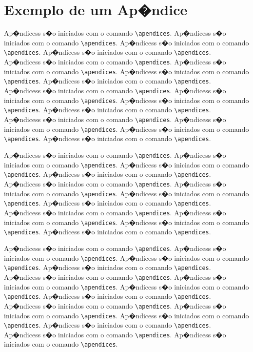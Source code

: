 \chapter{Exemplo de um Ap�ndice}
\label{apend:1}
Ap�ndicess s�o iniciados com o comando \verb|\apendices|.
Ap�ndicess s�o iniciados com o comando \verb|\apendices|.
Ap�ndicess s�o iniciados com o comando \verb|\apendices|.
Ap�ndicess s�o iniciados com o comando \verb|\apendices|.
Ap�ndicess s�o iniciados com o comando \verb|\apendices|.
Ap�ndicess s�o iniciados com o comando \verb|\apendices|.
Ap�ndicess s�o iniciados com o comando \verb|\apendices|.
Ap�ndicess s�o iniciados com o comando \verb|\apendices|.
Ap�ndicess s�o iniciados com o comando \verb|\apendices|.
Ap�ndicess s�o iniciados com o comando \verb|\apendices|.
Ap�ndicess s�o iniciados com o comando \verb|\apendices|.
Ap�ndicess s�o iniciados com o comando \verb|\apendices|.
Ap�ndicess s�o iniciados com o comando \verb|\apendices|.
Ap�ndicess s�o iniciados com o comando \verb|\apendices|.
Ap�ndicess s�o iniciados com o comando \verb|\apendices|.
Ap�ndicess s�o iniciados com o comando \verb|\apendices|.

Ap�ndicess s�o iniciados com o comando \verb|\apendices|.
Ap�ndicess s�o iniciados com o comando \verb|\apendices|.
Ap�ndicess s�o iniciados com o comando \verb|\apendices|.
Ap�ndicess s�o iniciados com o comando \verb|\apendices|.
Ap�ndicess s�o iniciados com o comando \verb|\apendices|.
Ap�ndicess s�o iniciados com o comando \verb|\apendices|.
Ap�ndicess s�o iniciados com o comando \verb|\apendices|.
Ap�ndicess s�o iniciados com o comando \verb|\apendices|.
Ap�ndicess s�o iniciados com o comando \verb|\apendices|.
Ap�ndicess s�o iniciados com o comando \verb|\apendices|.
Ap�ndicess s�o iniciados com o comando \verb|\apendices|.
Ap�ndicess s�o iniciados com o comando \verb|\apendices|.

Ap�ndicess s�o iniciados com o comando \verb|\apendices|.
Ap�ndicess s�o iniciados com o comando \verb|\apendices|.
Ap�ndicess s�o iniciados com o comando \verb|\apendices|.
Ap�ndicess s�o iniciados com o comando \verb|\apendices|.
Ap�ndicess s�o iniciados com o comando \verb|\apendices|.
Ap�ndicess s�o iniciados com o comando \verb|\apendices|.
Ap�ndicess s�o iniciados com o comando \verb|\apendices|.
Ap�ndicess s�o iniciados com o comando \verb|\apendices|.
Ap�ndicess s�o iniciados com o comando \verb|\apendices|.
Ap�ndicess s�o iniciados com o comando \verb|\apendices|.
Ap�ndicess s�o iniciados com o comando \verb|\apendices|.
Ap�ndicess s�o iniciados com o comando \verb|\apendices|.
Ap�ndicess s�o iniciados com o comando \verb|\apendices|.
Ap�ndicess s�o iniciados com o comando \verb|\apendices|.

